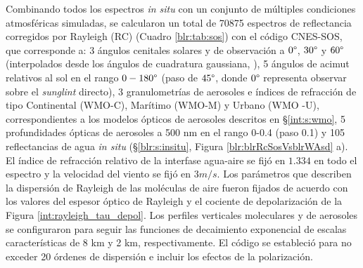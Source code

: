         Combinando todos los espectros \textit{in situ} con un conjunto de múltiples condiciones atmosféricas simuladas, se calcularon un total de 70875 espectros de reflectancia corregidos por Rayleigh (RC) (Cuadro \ref{blr:tab:sos}) con el código CNES-SOS, que corresponde a: 3 ángulos cenitales solares y de observación a $0\degree$, $ 30\degree$ y $60\degree$ (interpolados desde los ángulos de cuadratura gaussiana, \cite{lenoble2007}), 5 ángulos de acimut relativos al sol en el rango $0-180\degree$ (paso de $45\degree$, donde $0\degree$ representa observar sobre el \textit{sunglint} directo), 3 granulometrías de aerosoles e índices de refracción de tipo Continental (WMO-C), Marítimo (WMO-M) y Urbano (WMO -U), correspondientes a los modelos ópticos de aerosoles descritos en \S \ref{int:s:wmo}, 5 profundidades ópticas de aerosoles a 500 nm en el rango 0-0.4 (paso 0.1) y 105 reflectancias de agua \textit{in situ} (\S \ref{blr:s:insitu}, Figura \ref{blr:blrRcSosVsblrWAsd} a). El índice de refracción relativo de la interfase agua-aire se fijó en $1.334$ en todo el espectro y la velocidad del viento se fijó en $3 m/s$. Los parámetros que describen la dispersión de Rayleigh de las moléculas de aire fueron fijados de acuerdo con los valores del espesor óptico de Rayleigh y el cociente de depolarización de la Figura \ref{int:rayleigh_tau_depol}. Los perfiles verticales moleculares y de aerosoles se configuraron para seguir las funciones de decaimiento exponencial de escalas características de 8 km y 2 km, respectivamente. El código se estableció para no exceder 20 órdenes de dispersión e incluir los efectos de la polarización.
        
